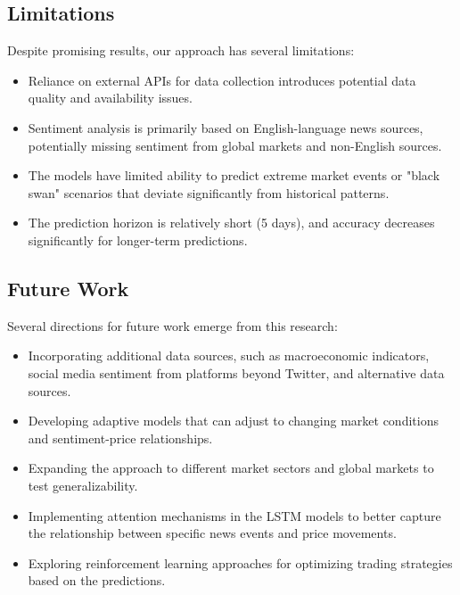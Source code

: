 \documentclass[review]{elsarticle}
\begin{document}
\subsection{Limitations}

Despite promising results, our approach has several limitations:

\begin{itemize}
    \item Reliance on external APIs for data collection introduces potential data quality and availability issues.
    
    \item Sentiment analysis is primarily based on English-language news sources, potentially missing sentiment from global markets and non-English sources.
    
    \item The models have limited ability to predict extreme market events or "black swan" scenarios that deviate significantly from historical patterns.
    
    \item The prediction horizon is relatively short (5 days), and accuracy decreases significantly for longer-term predictions.
\end{itemize}

\subsection{Future Work}

Several directions for future work emerge from this research:

\begin{itemize}
    \item Incorporating additional data sources, such as macroeconomic indicators, social media sentiment from platforms beyond Twitter, and alternative data sources.
    
    \item Developing adaptive models that can adjust to changing market conditions and sentiment-price relationships.
    
    \item Expanding the approach to different market sectors and global markets to test generalizability.
    
    \item Implementing attention mechanisms in the LSTM models to better capture the relationship between specific news events and price movements.
    
    \item Exploring reinforcement learning approaches for optimizing trading strategies based on the predictions.
\end{itemize}
\end{document}
